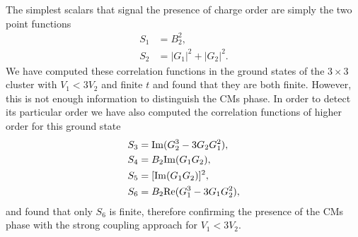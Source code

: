 \documentclass[aps,prx,10pt,twocolumn,floatfix,superscriptaddress,showpacs,numerical,footinbib]{revtex4-1}
\begin{document}
%
The simplest scalars that signal the presence of charge order are simply the two point functions
\begin{align}
S_1 &= B_2^2, \\
S_2 &= |G_1|^2+|G_2|^2.
\end{align}
We have computed these correlation functions in the ground states of the $3\times3$ cluster with $V_1<3V_2$ and finite $t$ and found that they are both finite. 
%
However, this is not enough information to distinguish the CMs phase. 
%
In order to detect its particular order we have also computed the correlation functions of higher order for this ground state
%
\begin{align}
S_3 &= {\rm Im}(G_2^3-3G_2 G_1^2),  \\
S_4 &= B_2 {\rm Im}(G_1G_2), \\
S_5 &= [{\rm Im}(G_1G_2)]^2, \\
S_6 &= B_2{\rm Re}(G_1^3-3G_1 G_2^2),
\end{align}
%
and found that only $S_6$ is finite, therefore confirming the presence of the CMs phase with the strong coupling approach for $V_1<3V_2$. 


\end{document}
